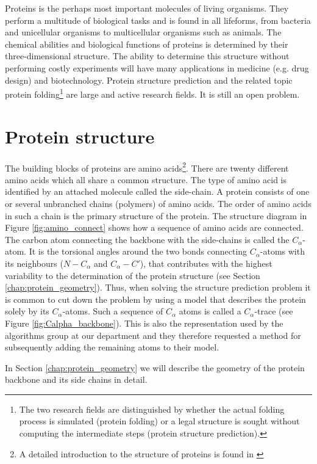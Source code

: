 Proteins is the perhaps most important molecules of living
organisms. They perform a multitude of biological tasks and is found
in all lifeforms, from bacteria and unicellular organisms to
multicellular organisms such as animals. The chemical abilities and
biological functions of proteins is determined by their
three-dimensional structure. The ability to determine this structure
without performing costly experiments will have many applications in
medicine (e.g. drug design) and biotechnology. Protein structure
prediction and the related topic protein folding\footnote{The two
  research fields are distinguished by whether the actual folding
  process is simulated (protein folding) or a legal structure is
  sought without computing the intermediate steps (protein structure
  prediction).} are large and active research fields. It is still an
open problem.

\section{Protein structure}
The building blocks of proteins are amino acids\footnote{A detailed
  introduction to the structure of proteins is found in
  \cite{branden}}. There are twenty different amino acids which all
share a common structure. The type of amino acid is identified by an
attached molecule called the side-chain. A protein consists of one or
several unbranched chains (polymers) of amino acids. The order of
amino acids in such a chain is the primary structure of the protein.
The structure diagram in Figure \ref{fig:amino_connect} shows how a
sequence of amino acids are connected. The carbon atom connecting the
backbone with the side-chains is called the $C_\alpha$-atom. It is the
torsional angles around the two bonds connecting $C_\alpha$-atoms with
its neighbours ($N-C_\alpha$ and $C_\alpha-C'$), that contributes with
the highest variability to the determination of the protein structure
(see Section \ref{chap:protein_geometry}). Thus, when solving the
structure prediction problem it is common  to cut down
the problem by using a model that describes the protein solely by its
$C_\alpha$-atoms. Such a sequence of $C_{\alpha}$ atoms is called a
$C_{\alpha}$-trace (see Figure \ref{fig:Calpha_backbone}). This is
also the representation used by the algorithms group at our department
and they therefore requested a method for subsequently adding the
remaining atoms to their model.

In Section \ref{chap:protein_geometry} we will describe the geometry
of the protein backbone and its side chains in detail.

